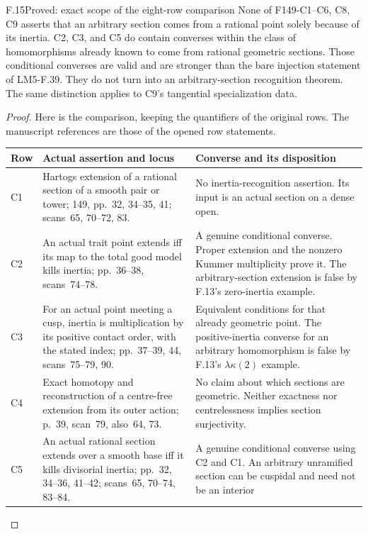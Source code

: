 \begin{claim}{F.15}{Proved: exact scope of the eight-row comparison}
None of F149-C1--C6, C8, C9 asserts that an arbitrary section
comes from a rational point solely because of its inertia. C2,
C3, and C5 do contain converses within the class of homomorphisms
already known to come from rational geometric sections. Those
conditional converses are valid and are stronger than the bare
injection statement of LM5-F.39. They do not turn into an
arbitrary-section recognition theorem. The same distinction applies
to C9's tangential specialization data.
\end{claim}
\begin{proof}
Here is the comparison, keeping the quantifiers of the original rows.
The manuscript references are those of the opened row statements.
\begin{longtable}{@{}>{\raggedright\arraybackslash}p{}>{\raggedright\arraybackslash}p{}>{\raggedright\arraybackslash}p{}@{}}
\toprule
Row & Actual assertion and locus & Converse and its disposition\\
\midrule\endhead
C1 & Hartogs extension of a rational section of a smooth pair or
tower; 149, pp.~32, 34--35, 41; scans~65, 70--72, 83.
& No inertia-recognition assertion. Its input is an actual section
on a dense open.\\
C2 & An actual trait point extends iff its map to the total good
model kills inertia; pp.~36--38, scans~74--78.
& A genuine conditional converse. Proper extension and the nonzero
Kummer multiplicity prove it. The arbitrary-section extension is
false by F.13's zero-inertia example.\\
C3 & For an actual point meeting a cusp, inertia is multiplication
by its positive contact order, with the stated index; pp.~37--39,
44, scans~75--79, 90.
& Equivalent conditions for that already geometric point. The
positive-inertia converse for an arbitrary homomorphism is false
by F.13's $\lambda\kappa(2)$ example.\\
C4 & Exact homotopy and reconstruction of a centre-free extension
from its outer action; p.~39, scan~79, also~64, 73.
& No claim about which sections are geometric. Neither exactness
nor centrelessness implies section surjectivity.\\
C5 & An actual rational section extends over a smooth base iff it
kills divisorial inertia; pp.~32, 34--36, 41--42;
scans~65, 70--74, 83--84.
& A genuine conditional converse using C2 and C1. An arbitrary
unramified section can be cuspidal and need not be an interior

\end{longtable}
\end{proof}
